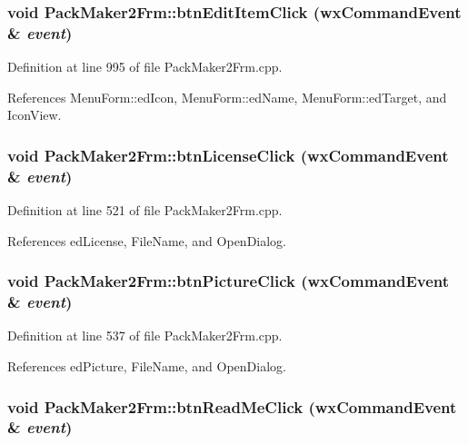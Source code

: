 \subsubsection{\setlength{\rightskip}{0pt plus 5cm}void Pack\-Maker2Frm::btn\-Edit\-Item\-Click (wx\-Command\-Event \& {\em event})}\label{class_pack_maker2_frm_29c98849df5c544d3a5616084a91c439}




Definition at line 995 of file Pack\-Maker2Frm.cpp.

References Menu\-Form::ed\-Icon, Menu\-Form::ed\-Name, Menu\-Form::ed\-Target, and Icon\-View.
\subsubsection{\setlength{\rightskip}{0pt plus 5cm}void Pack\-Maker2Frm::btn\-License\-Click (wx\-Command\-Event \& {\em event})}\label{class_pack_maker2_frm_8825ca805d98e2825110751050d368f3}




Definition at line 521 of file Pack\-Maker2Frm.cpp.

References ed\-License, File\-Name, and Open\-Dialog.
\subsubsection{\setlength{\rightskip}{0pt plus 5cm}void Pack\-Maker2Frm::btn\-Picture\-Click (wx\-Command\-Event \& {\em event})}\label{class_pack_maker2_frm_2fa10556d450da7ab5f94e5d9959d26b}




Definition at line 537 of file Pack\-Maker2Frm.cpp.

References ed\-Picture, File\-Name, and Open\-Dialog.
\subsubsection{\setlength{\rightskip}{0pt plus 5cm}void Pack\-Maker2Frm::btn\-Read\-Me\-Click (wx\-Command\-Event \& {\em event})}\label{class_pack_maker2_frm_8d5aac046129dbfa0acc18b611f5ccb9}




